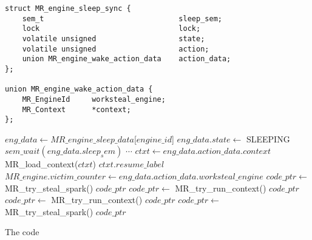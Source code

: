 \begin{algorithm}[tbp]
\begin{minipage}{\textwidth}
\begin{verbatim}
struct MR_engine_sleep_sync {
    sem_t                               sleep_sem;
    lock                                lock;
    volatile unsigned                   state;
    volatile unsigned                   action;
    union MR_engine_wake_action_data    action_data;
};

union MR_engine_wake_action_data {
    MR_EngineId     worksteal_engine;
    MR_Context      *context;
};
\end{verbatim}

\begin{algorithmic}
        \Loop
            \State $eng\_data \gets MR\_engine\_sleep\_data$[$engine\_id$]
            \State $eng\_data.state \gets$ SLEEPING
            \State $sem\_wait(eng\_data.sleep_sem)$
                \State $\cdots$
              \EndCase
                \State $ctxt \gets eng\_data.action\_data.context$
                \State MR\_load\_context($ctxt$)
                \Goto $ctxt.resume\_label$
              \EndCase
                \State $MR\_engine.victim\_counter \gets
                    eng\_data.action\_data.worksteal\_engine$
                \State $code\_ptr \gets$ MR\_try\_steal\_spark()
                    \Goto $code\_ptr$
                \EndIf
                \State $code\_ptr \gets$ MR\_try\_run\_context()
                    \Goto $code\_ptr$
                \EndIf
                \State \Break
              \EndCase
                \State $code\_ptr \gets$ MR\_try\_run\_context()
                    \Goto $code\_ptr$
                \EndIf
                \State $code\_ptr \gets$ MR\_try\_steal\_spark()
                    \Goto $code\_ptr$
                \EndIf
                \State \Break
              \EndCase
            \EndSwitch
        \EndLoop
    \EndProcedure
\end{algorithmic}

\end{minipage}
\caption{The \sleep code}
\end{algorithm}

